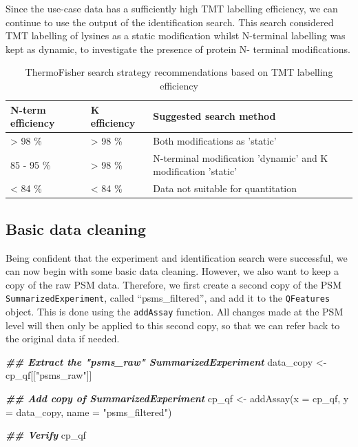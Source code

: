 \documentclass[9pt,a4paper,]{extarticle}
\newenvironment{Shaded}{\begin{snugshade}}{\end{snugshade}}
\newcommand{\AttributeTok}[1]{\textcolor[rgb]{0.77,0.63,0.00}{#1}}
\newcommand{\DocumentationTok}[1]{\textcolor[rgb]{0.56,0.35,0.01}{\textbf{\textit{#1}}}}
\newcommand{\FunctionTok}[1]{\textcolor[rgb]{0.00,0.00,0.00}{#1}}
\newcommand{\NormalTok}[1]{#1}
\newcommand{\OtherTok}[1]{\textcolor[rgb]{0.56,0.35,0.01}{#1}}
\newcommand{\StringTok}[1]{\textcolor[rgb]{0.31,0.60,0.02}{#1}}
\begin{document}
Since the use-case data has a sufficiently high TMT labelling efficiency, we
can continue to use the output of the identification search. This search
considered TMT labelling of lysines as a static modification whilst N-terminal
labelling was kept as dynamic, to investigate the presence of protein N-
terminal modifications.

\begin{table}

\caption{\label{tab:table2}ThermoFisher search strategy recommendations based on TMT labelling efficiency}
\centering
\begin{tabular}[t]{l|l|l}
\hline
N-term efficiency & K efficiency & Suggested search method\\
\hline
> 98 \% & > 98 \% & Both modifications as 'static'\\
\hline
85 - 95 \% & > 98 \% & N-terminal modification 'dynamic' and K modification 'static'\\
\hline
< 84 \% & < 84 \% & Data not suitable for quantitation\\
\hline
\end{tabular}
\end{table}

\hypertarget{basic-data-cleaning}{%
\subsection{Basic data cleaning}\label{basic-data-cleaning}}

Being confident that the experiment and identification search were successful,
we can now begin with some basic data cleaning. However, we also want to keep a
copy of the raw PSM data. Therefore, we first create a second copy of the PSM
\texttt{SummarizedExperiment}, called ``psms\_filtered'', and add it to the \texttt{QFeatures}
object. This is done using the \texttt{addAssay} function. All changes made at the PSM
level will then only be applied to this second copy, so that we can refer back
to the original data if needed.

\begin{Shaded}
\begin{Highlighting}[]
\DocumentationTok{\#\# Extract the "psms\_raw" SummarizedExperiment}
\NormalTok{data\_copy }\OtherTok{\textless{}{-}}\NormalTok{ cp\_qf[[}\StringTok{"psms\_raw"}\NormalTok{]]}

\DocumentationTok{\#\# Add copy of SummarizedExperiment}
\NormalTok{cp\_qf }\OtherTok{\textless{}{-}} \FunctionTok{addAssay}\NormalTok{(}\AttributeTok{x =}\NormalTok{ cp\_qf, }
                  \AttributeTok{y =}\NormalTok{ data\_copy,}
                  \AttributeTok{name =} \StringTok{"psms\_filtered"}\NormalTok{)}

\DocumentationTok{\#\# Verify}
\NormalTok{cp\_qf}
\end{Highlighting}
\end{Shaded}
\end{document}

